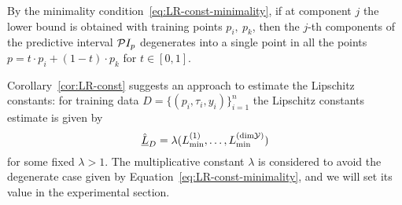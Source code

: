 \begin{rmk}
By the minimality condition~\eqref{eq:LR-const-minimality}, if at component $j$ the lower bound is obtained with training points $p_i, \ p_k$, then the $j$-th components of the predictive interval $\mathcal PI_{p}$ degenerates into a single point in all the points $p = t \cdot p_i + (1-t) \cdot p_k$ for $t \in [0,1]$. 
\end{rmk}

Corollary~\ref{cor:LR-const} suggests an approach to estimate the Lipschitz constants: for training data $D=\{ (p_i, \tau_i, y_i) \}_{i=1}^n$ the Lipschitz constants estimate is given by 
\begin{equation}\label{eq:lips-const}
    \hat{\underline{L}}_D = \lambda ( L^{(1)}_{\min}, \dots, L^{(\text{dim}\mathcal Y)}_{\min})
\end{equation} for some fixed $\lambda > 1$. 
The multiplicative constant $\lambda$ is considered to avoid the degenerate case given by Equation~\eqref{eq:LR-const-minimality}, and we will set its value in the experimental section.
